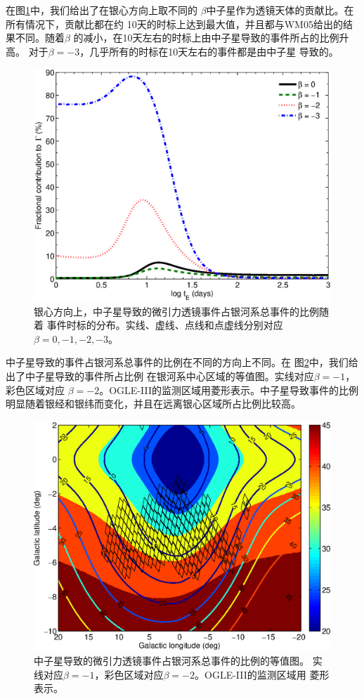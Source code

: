 在图\ref{ratio_beta}中，我们给出了在银心方向上取不同的
$\beta$中子星作为透镜天体的贡献比。在所有情况下，贡献比都在约
10天的时标上达到最大值，并且都与WM05给出的结果不同。随着$\beta$
的减小，在10天左右的时标上由中子星导致的事件所占的比例升高。
对于$\beta=-3$，几乎所有的时标在10天左右的事件都是由中子星
导致的。
%
\begin{figure}
\begin{center}
  \includegraphics[width=4 in,trim=0 0 0 3cm]{ratio_beta.eps}
%
\caption{银心方向上，中子星导致的微引力透镜事件占银河系总事件的比例随着
事件时标的分布。实线、虚线、点线和点虚线分别对应$\beta=0,-1,-2,-3$。}
\label{ratio_beta}
\end{center}
\end{figure}
%

中子星导致的事件占银河系总事件的比例在不同的方向上不同。在
图\ref{map_percentage}中，我们给出了中子星导致的事件所占比例
在银河系中心区域的等值图。实线对应$\beta=-1$，彩色区域对应
$\beta=-2$。OGLE-III的监测区域用菱形表示。中子星导致事件的比例
明显随着银经和银纬而变化，并且在远离银心区域所占比例比较高。
%
\begin{figure}
\begin{center}
  \includegraphics[width=4 in,trim=0 0 0 3cm]{map_percentage.eps}
%
\caption{中子星导致的微引力透镜事件占银河系总事件的比例的等值图。
实线对应$\beta=-1$，彩色区域对应$\beta=-2$。OGLE-III的监测区域用
菱形表示。}
\label{map_percentage}
\end{center}
\end{figure}
%


